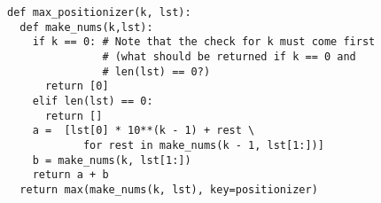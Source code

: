 \begin{blocksection}
\begin{solution}
\begin{lstlisting}
def max_positionizer(k, lst):
  def make_nums(k,lst):
    if k == 0: # Note that the check for k must come first 
               # (what should be returned if k == 0 and 
               # len(lst) == 0?)
      return [0]
    elif len(lst) == 0:
      return []
    a =  [lst[0] * 10**(k - 1) + rest \
            for rest in make_nums(k - 1, lst[1:])]
    b = make_nums(k, lst[1:])
    return a + b
  return max(make_nums(k, lst), key=positionizer)
\end{lstlisting}
\end{solution}
\end{blocksection}